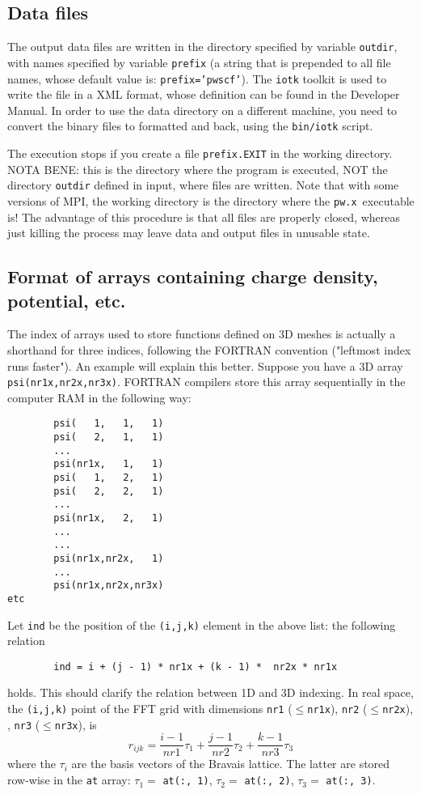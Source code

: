 \documentclass[12pt,a4paper]{article}
\def\pwx{\texttt{pw.x}}
\begin{document}
\subsection{Data files}

The output data files are written in the directory specified by variable
\texttt{outdir}, with names specified by variable \texttt{prefix} (a string that is prepended
to all file names, whose default value is: \texttt{prefix='pwscf'}). The \texttt{iotk}
toolkit is used to write the file in a XML format, whose definition can
be found in the Developer Manual. In order to use the data directory
on a different machine, you need to convert the binary files to formatted
and back, using the \texttt{bin/iotk} script.

The execution stops if you create a file \texttt{prefix.EXIT} in the working 
directory. NOTA BENE: this is the directory where the program 
is executed, NOT the directory \texttt{outdir} defined in input, where files 
are written. Note that with some versions of MPI, the working directory 
is the directory where the \pwx\ executable is! The advantage of this 
procedure is that all files are properly closed, whereas  just killing 
the process may leave data and output files in unusable state.

\subsection{Format of arrays containing charge density, potential, etc.}

The index of arrays used to store functions defined on 3D meshes is
actually a shorthand for three indices, following the FORTRAN convention 
("leftmost index runs faster"). An example will explain this better. 
Suppose you have a 3D array \texttt{psi(nr1x,nr2x,nr3x)}. FORTRAN 
compilers store this array sequentially  in the computer RAM in the following way:
\begin{verbatim}
        psi(   1,   1,   1)
        psi(   2,   1,   1)
        ...
        psi(nr1x,   1,   1)
        psi(   1,   2,   1)
        psi(   2,   2,   1)
        ...
        psi(nr1x,   2,   1)
        ...
        ...
        psi(nr1x,nr2x,   1)
        ...
        psi(nr1x,nr2x,nr3x)
etc
\end{verbatim}
Let \texttt{ind} be the position of the \texttt{(i,j,k)} element in the above list: 
the following relation
\begin{verbatim}
        ind = i + (j - 1) * nr1x + (k - 1) *  nr2x * nr1x
\end{verbatim}
holds. This should clarify the relation between 1D and 3D indexing. In real
space, the \texttt{(i,j,k)} point of the FFT grid with dimensions 
\texttt{nr1} ($\le$\texttt{nr1x}), 
\texttt{nr2}  ($\le$\texttt{nr2x}), , \texttt{nr3} ($\le$\texttt{nr3x}), is
$$
r_{ijk}=\frac{i-1}{nr1} \tau_1  +  \frac{j-1}{nr2} \tau_2 +
\frac{k-1}{nr3} \tau_3 
$$
where the $\tau_i$ are the basis vectors of the Bravais lattice. 
The latter are stored row-wise in the \texttt{at} array:
$\tau_1 = $ \texttt{at(:, 1)}, 
$\tau_2 = $ \texttt{at(:, 2)}, 
$\tau_3 = $ \texttt{at(:, 3)}.
\end{document}

